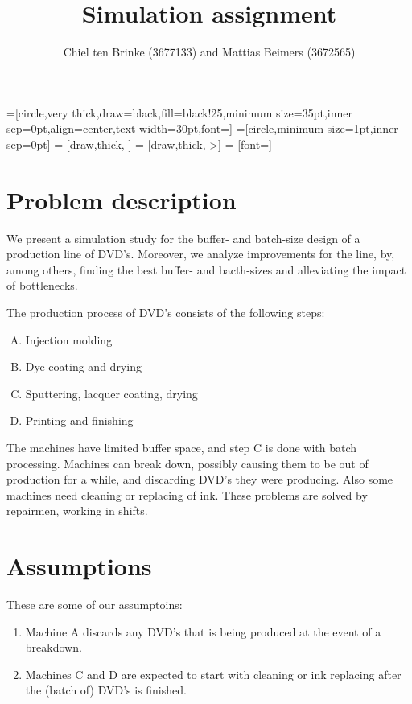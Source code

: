 \documentclass{article}
\title{Simulation assignment}
\author{Chiel ten Brinke (3677133) and Mattias Beimers (3672565)}
\date{\vspace{-3ex}}
\begin{document}
    =[circle,very thick,draw=black,fill=black!25,minimum size=35pt,inner sep=0pt,align=center,text width=30pt,font=\scriptsize]
    =[circle,minimum size=1pt,inner sep=0pt]
     = [draw,thick,-]
     = [draw,thick,->]
     = [font=\scriptsize]

    \maketitle

    
    \section{Problem description}
        We present a simulation study for the buffer- and batch-size design of a production line of DVD's.
        Moreover, we analyze improvements for the line, by, among others, finding the best buffer- and bacth-sizes and alleviating the impact of bottlenecks.

        The production process of DVD's consists of the following steps:
        \begin{enumerate}[A.]
            \item Injection molding
            \item Dye coating and drying
            \item Sputtering, lacquer coating, drying
            \item Printing and finishing 
        \end{enumerate}
        The machines have limited buffer space, and step C is done with batch processing.
        Machines can break down, possibly causing them to be out of production for a while,
        and discarding DVD's they were producing. Also some machines need cleaning or replacing of ink.
        These problems are solved by repairmen, working in shifts.

    \section{Assumptions}
        These are some of our assumptoins:
        \begin{enumerate}
            \item 
                Machine A discards any DVD's that is being produced at the event of a breakdown.
            \item 
                Machines C and D are expected to start with cleaning or ink replacing after the (batch of) DVD's is finished.
        \end{enumerate}
\end{document}
